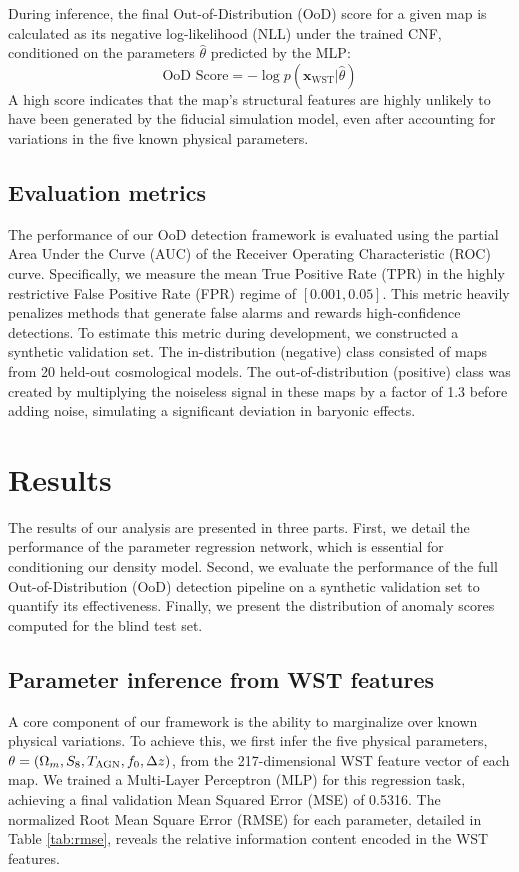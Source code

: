 \documentclass[]{article}
\begin{document}
During inference, the final Out-of-Distribution (OoD) score for a given map is calculated as its negative log-likelihood (NLL) under the trained CNF, conditioned on the parameters $\hat{\theta}$ predicted by the MLP:
\begin{equation}
    \text{OoD Score} = - \log p(\mathbf{x}_{\text{WST}} | \hat{\theta})
\end{equation}
A high score indicates that the map's structural features are highly unlikely to have been generated by the fiducial simulation model, even after accounting for variations in the five known physical parameters.

\subsection{Evaluation metrics}
The performance of our OoD detection framework is evaluated using the partial Area Under the Curve (AUC) of the Receiver Operating Characteristic (ROC) curve. Specifically, we measure the mean True Positive Rate (TPR) in the highly restrictive False Positive Rate (FPR) regime of $[0.001, 0.05]$. This metric heavily penalizes methods that generate false alarms and rewards high-confidence detections. To estimate this metric during development, we constructed a synthetic validation set. The in-distribution (negative) class consisted of maps from 20 held-out cosmological models. The out-of-distribution (positive) class was created by multiplying the noiseless signal in these maps by a factor of 1.3 before adding noise, simulating a significant deviation in baryonic effects.

\section{Results}
\label{sec:results}
The results of our analysis are presented in three parts. First, we detail the performance of the parameter regression network, which is essential for conditioning our density model. Second, we evaluate the performance of the full Out-of-Distribution (OoD) detection pipeline on a synthetic validation set to quantify its effectiveness. Finally, we present the distribution of anomaly scores computed for the blind test set.

\subsection{Parameter inference from WST features}
A core component of our framework is the ability to marginalize over known physical variations. To achieve this, we first infer the five physical parameters, $\theta = (\Omega_m, S_8, T_{\rm AGN}, f_0, \Delta z)$, from the 217-dimensional WST feature vector of each map. We trained a Multi-Layer Perceptron (MLP) for this regression task, achieving a final validation Mean Squared Error (MSE) of 0.5316. The normalized Root Mean Square Error (RMSE) for each parameter, detailed in Table \ref{tab:rmse}, reveals the relative information content encoded in the WST features.
\end{document}
